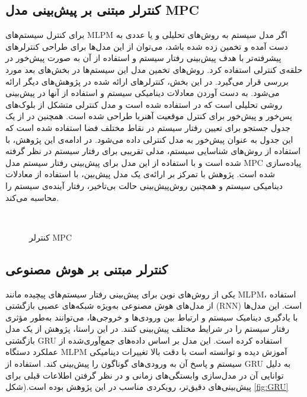\subsection{کنترلر مبتنی بر پیش‌بینی مدل MPC}
برای کنترل سیستم‌های MLPM اگر مدل سیستم به روش‌های تحلیلی و یا عددی به دست آمده و تخمین زده شده باشد، می‌توان از این مدل‌ها برای طراحی کنترلرهای پیشرفته‌تر با هدف پیش‌بینی رفتار سیستم و استفاده از آن به صورت پیش‌خور در حلقه‌ی کنترلی استفاده کرد. روش‌های تخمین مدل این سیستم‌ها در بخش‌های بعد مورد بررسی قرار می‌گیرد. در این بخش، کنترلرهای ارائه شده در پژوهش‌های دیگر ارائه می‌شود.
به دست آوردن معادلات دینامیکی سیستم و استفاده از آنها در پیش‌بینی روشی تحلیلی است که در 
\cite{RN55}
استفاده شده است و مدل کنترلی متشکل از بلوک‌های پس‌خور و پیش‌خور برای کنترل موقعیت آهنربا طراحی شده است. همچنین در 
\cite{RN62}
از یک جدول جستجو برای تعیین رفتار سیستم در نقاط مختلف فضا استفاده شده است که این جدول به عنوان پیش‌خور به مدل کنترلی داده می‌شود. در ادامه‌ی این پژوهش، با استفاده از روش‌های شناسایی سیستم، مدلی تقریبی برای رفتار سیستم در نظر گرفته شده است و با استفاده از این مدل برای پیش‌بینی رفتار سیستم‌ مدل MPC پیاده‌سازی شده است. پژوهش 
\cite{RN30}
با تمرکز بر ارائه‌ی یک مدل پیش‌بین، با استفاده از معادلات دینامیکی سیستم و همچنین روش‌پیش‌بینی حالت بی‌تاخیر، رفتار آینده‌ی سیستم را محاسبه می‌کند.
\begin{figure}[ht]
	\centering 
	\\ %
	\caption{کنترلر MPC}
	\label{fig:MPC} %
\end{figure}

\FloatBarrier

\subsection{کنترلر مبتنی بر هوش مصنوعی}

یکی از روش‌های نوین برای پیش‌بینی رفتار سیستم‌های پیچیده مانند MLPM، استفاده از مدل‌های هوش مصنوعی به‌ویژه شبکه‌های عصبی بازگشتی (RNN) است. این مدل‌ها با یادگیری دینامیک سیستم و ارتباط بین ورودی‌ها و خروجی‌ها، می‌توانند به‌طور مؤثری رفتار سیستم را در شرایط مختلف پیش‌بینی کنند. در این راستا، پژوهش
\cite{RN61}
از یک مدل بازگشتی GRU 
استفاده کرده است. این مدل بر اساس داده‌های جمع‌آوری‌شده از عملکرد دستگاه MLPM آموزش دیده و توانسته است با دقت بالا تغییرات دینامیکی سیستم و پاسخ آن به ورودی‌های گوناگون را پیش‌بینی کند. استفاده از GRU به دلیل توانایی آن در مدل‌سازی وابستگی‌های زمانی و در نظر گرفتن اطلاعات قبلی برای پیش‌بینی‌های دقیق‌تر، رویکردی مناسب در این پژوهش بوده است.(شکل 
\ref{fig:GRU}

